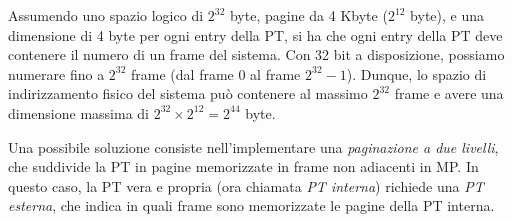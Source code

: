 Assumendo uno spazio logico di \(2^{32}\) byte, pagine da 4 Kbyte (\(2^{12}\) byte), e una dimensione di 4 byte per ogni entry della PT, si ha che ogni entry della PT deve contenere il numero di un frame del sistema. Con 32 bit a disposizione, possiamo numerare fino a \(2^{32}\) frame (dal frame 0 al frame \(2^{32}-1\)). Dunque, lo spazio di indirizzamento fisico del sistema può contenere al massimo \(2^{32}\) frame e avere una dimensione massima di \(2^{32} \times 2^{12} = 2^{44}\) byte.


Una possibile soluzione consiste nell'implementare una \emph{paginazione a due livelli}, che suddivide la PT in pagine memorizzate in frame non adiacenti in MP. In questo caso, la PT vera e propria (ora chiamata \emph{PT interna}) richiede una \emph{PT esterna}, che indica in quali frame sono memorizzate le pagine della PT interna.


